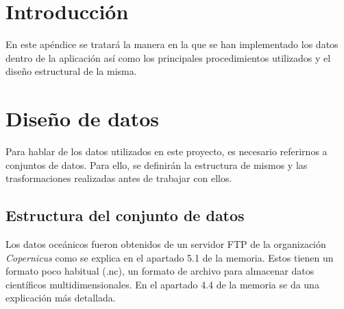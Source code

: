 
\section{Introducción}

En este apéndice se tratará la manera en la que se han implementado los datos dentro de la aplicación así como los principales procedimientos utilizados y el diseño estructural de la misma.

\section{Diseño de datos} \label{diseño_datos}

Para hablar de los datos utilizados en este proyecto, es necesario referirnos a conjuntos de datos. Para ello, se definirán la estructura de mismos y las trasformaciones realizadas antes de trabajar con ellos.

\subsection{Estructura del conjunto de datos}

Los datos oceánicos fueron obtenidos de un servidor FTP de la organización \emph{Copernicus} como se explica en el apartado 5.1 de la memoria. Estos tienen un formato poco habitual (.nc), un formato de archivo para almacenar datos científicos multidimensionales. En el apartado 4.4 de la memoria se da una explicación más detallada.

